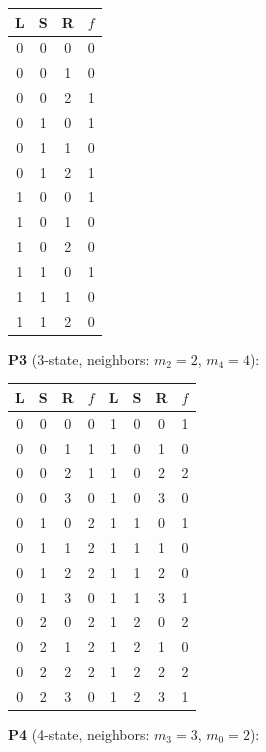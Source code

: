 \documentclass[11pt]{article}
\begin{document}
\begin{center}
\begin{tabular}{cccc}
\toprule
L & S & R & $f$ \\
\midrule
0 & 0 & 0 & 0 \\
0 & 0 & 1 & 0 \\
0 & 0 & 2 & 1 \\
0 & 1 & 0 & 1 \\
0 & 1 & 1 & 0 \\
0 & 1 & 2 & 1 \\
1 & 0 & 0 & 1 \\
1 & 0 & 1 & 0 \\
1 & 0 & 2 & 0 \\
1 & 1 & 0 & 1 \\
1 & 1 & 1 & 0 \\
1 & 1 & 2 & 0 \\
\bottomrule
\end{tabular}
\end{center}

\noindent\textbf{P3} (3-state, neighbors: $m_2=2$, $m_4=4$):

\begin{center}
\begin{tabular}{cccc@{\qquad}cccc}
\toprule
L & S & R & $f$ & L & S & R & $f$ \\
\midrule
0 & 0 & 0 & 0 & 1 & 0 & 0 & 1 \\
0 & 0 & 1 & 1 & 1 & 0 & 1 & 0 \\
0 & 0 & 2 & 1 & 1 & 0 & 2 & 2 \\
0 & 0 & 3 & 0 & 1 & 0 & 3 & 0 \\
0 & 1 & 0 & 2 & 1 & 1 & 0 & 1 \\
0 & 1 & 1 & 2 & 1 & 1 & 1 & 0 \\
0 & 1 & 2 & 2 & 1 & 1 & 2 & 0 \\
0 & 1 & 3 & 0 & 1 & 1 & 3 & 1 \\
0 & 2 & 0 & 2 & 1 & 2 & 0 & 2 \\
0 & 2 & 1 & 2 & 1 & 2 & 1 & 0 \\
0 & 2 & 2 & 2 & 1 & 2 & 2 & 2 \\
0 & 2 & 3 & 0 & 1 & 2 & 3 & 1 \\
\bottomrule
\end{tabular}
\end{center}

\noindent\textbf{P4} (4-state, neighbors: $m_3=3$, $m_0=2$):
\end{document}

